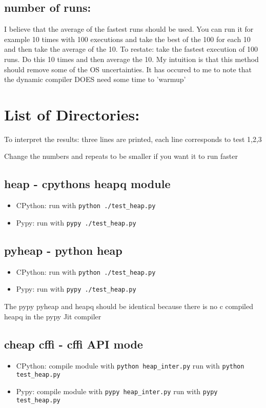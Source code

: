 \documentclass[11pt]{article}
\begin{document}
\subsection{number of runs:}
\label{sec-2-4}
I believe that the average of the fastest runs should be used. 
You can run it for example 10 times with 100 executions and 
take the best of the 100 for each 10 and then take the average of the 10.
To restate: take the fastest execution of 100 runs. 
Do this 10 times and then average the 10. 
My intuition is that this method should remove some of the OS uncertainties.
It has occured to me to note 
that the dynamic compiler DOES need some time to 'warmup'


\section{List of Directories:}
\label{sec-3}
To interpret the results: three lines are printed, each line corresponds to test 1,2,3

Change the numbers and repeats to be smaller if you want it to run faster

\subsection{heap - cpythons heapq module}
\label{sec-3-1}
\begin{itemize}
\item CPython: run with \verb~python ./test_heap.py~
\item Pypy: run with  \verb~pypy ./test_heap.py~
\end{itemize}
\subsection{pyheap - python heap}
\label{sec-3-2}
\begin{itemize}
\item CPython: run with \verb~python ./test_heap.py~
\item Pypy: run with  \verb~pypy ./test_heap.py~
\end{itemize}
The pypy pyheap and heapq should be identical because there is no c compiled heapq in the pypy Jit compiler
\subsection{cheap cffi - cffi API mode}
\label{sec-3-3}
\begin{itemize}
\item CPython: compile module with \verb~python heap_inter.py~ run with \verb~python test_heap.py~
\item Pypy: compile module with \verb~pypy heap_inter.py~ run with \verb~pypy test_heap.py~
\end{itemize}
\end{document}
